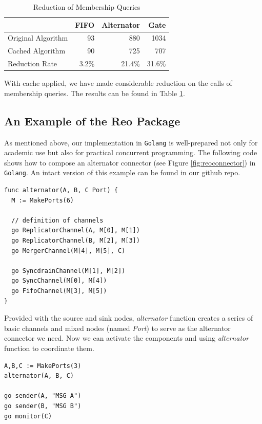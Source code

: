 \documentclass[conference, a4paper]{IEEEtran}
\begin{document}
\begin{table}[ht]
  \renewcommand{\arraystretch}{1.3}
  \caption{Reduction of Membership Queries}
  \label{tabel:cacheoptimization}
  \centering
  \begin{tabular}{l||rrr}
    \hline
    & FIFO & Alternator & Gate \\
    \hline\hline
    Original Algorithm & 93 & 880 & 1034 \\
    Cached Algorithm & 90 & 725 & 707 \\
    Reduction Rate & 3.2\% & 21.4\% & 31.6\% \\
    \hline
  \end{tabular}
\end{table}

With cache applied, we have made considerable reduction on the calls of membership queries. The results
can be found in Table \ref{tabel:cacheoptimization}.

\subsection{An Example of the Reo Package }
\label{sec:reolib}

As mentioned above, our implementation in \texttt{Golang} is well-prepared not only for academic use
but also for practical concurrent programming. The following code shows how to compose an alternator
connector (see Figure \ref{fig:reoconnector}) in \texttt{Golang}. An intact version of this example
can be found in our github repo.

\begin{lstlisting}
func alternator(A, B, C Port) {
  M := MakePorts(6)

  // definition of channels
  go ReplicatorChannel(A, M[0], M[1])
  go ReplicatorChannel(B, M[2], M[3])
  go MergerChannel(M[4], M[5], C)

  go SyncdrainChannel(M[1], M[2])
  go SyncChannel(M[0], M[4])
  go FifoChannel(M[3], M[5])
}
\end{lstlisting}

Provided with the source and sink nodes, \emph{alternator} function creates a series of basic
channels and mixed nodes (named \emph{Port}) to serve as the alternator connector we need. Now we
can activate the components and using \emph{alternator} function to coordinate them.

\begin{lstlisting}
A,B,C := MakePorts(3)
alternator(A, B, C)

go sender(A, "MSG A")
go sender(B, "MSG B")
go monitor(C)
\end{lstlisting}
\end{document}
